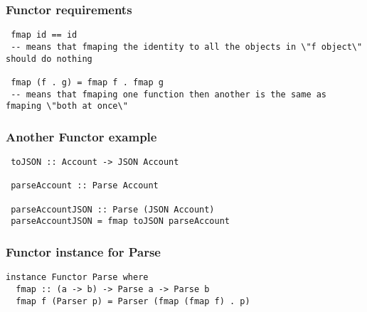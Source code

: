 \documentclass{beamer}
\begin{document}
\begin{frame}
\frametitle{Functor requirements}

\begin{lstlisting}
 fmap id == id
 -- means that fmaping the identity to all the objects in \"f object\" should do nothing

 fmap (f . g) = fmap f . fmap g
 -- means that fmaping one function then another is the same as fmaping \"both at once\"
\end{lstlisting}

\end{frame}


%
%


\begin{frame}
\frametitle{Another Functor example}

\begin{lstlisting}
 toJSON :: Account -> JSON Account

 parseAccount :: Parse Account

 parseAccountJSON :: Parse (JSON Account)
 parseAccountJSON = fmap toJSON parseAccount
\end{lstlisting}

%
\end{frame}


\begin{frame}
\frametitle{Functor instance for Parse}

\begin{lstlisting}
instance Functor Parse where
  fmap :: (a -> b) -> Parse a -> Parse b
  fmap f (Parser p) = Parser (fmap (fmap f) . p)
\end{lstlisting}

%

\end{frame}
\end{document}
